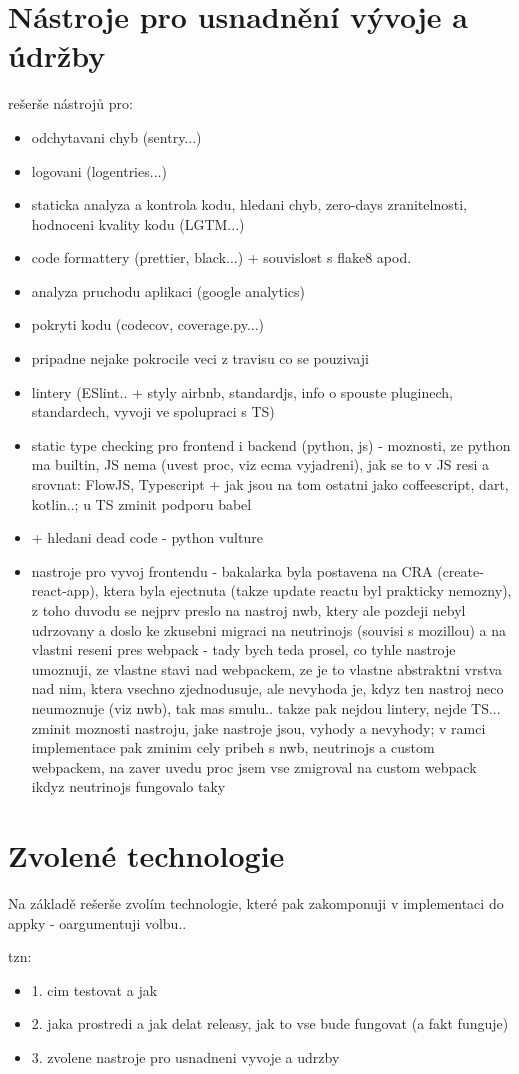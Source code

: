 \chapter{Nástroje pro usnadnění vývoje a údržby}
rešerše nástrojů pro:
\begin{itemize}
\item odchytavani chyb (sentry...)
\item logovani (logentries...)
\item staticka analyza a kontrola kodu, hledani chyb, zero-days zranitelnosti, hodnoceni kvality kodu (LGTM...)
\item code formattery (prettier, black...) + souvislost s flake8 apod.
\item analyza pruchodu aplikaci (google analytics)
\item pokryti kodu (codecov, coverage.py...)
\item pripadne nejake pokrocile veci z travisu co se pouzivaji
\item lintery (ESlint.. + styly airbnb, standardjs, info o spouste pluginech, standardech, vyvoji ve spolupraci s TS)
\item static type checking pro frontend i backend (python, js) - moznosti, ze python ma builtin, JS nema (uvest proc, viz ecma vyjadreni), jak se to v JS resi a srovnat: FlowJS, Typescript + jak jsou na tom ostatni jako coffeescript, dart, kotlin..; u TS zminit podporu babel
\item + hledani dead code - python vulture
\item nastroje pro vyvoj frontendu - bakalarka byla postavena na CRA (create-react-app), ktera byla ejectnuta (takze update reactu byl prakticky nemozny), z toho duvodu se nejprv preslo na nastroj nwb, ktery ale pozdeji nebyl udrzovany a doslo ke zkusebni migraci na neutrinojs (souvisi s mozillou) a na vlastni reseni pres webpack - tady bych teda prosel, co tyhle nastroje umoznuji, ze vlastne stavi nad webpackem, ze je to vlastne abstraktni vrstva nad nim, ktera vsechno zjednodusuje, ale nevyhoda je, kdyz ten nastroj neco neumoznuje (viz nwb), tak mas smulu.. takze pak nejdou lintery, nejde TS... zminit moznosti nastroju, jake nastroje jsou, vyhody a nevyhody; v ramci implementace pak zminim cely pribeh s nwb, neutrinojs a custom webpackem, na zaver uvedu proc jsem vse zmigroval na custom webpack ikdyz neutrinojs fungovalo taky
\end{itemize}


\chapter{Zvolené technologie}
Na základě rešerše zvolím technologie, které pak zakomponuji v implementaci do appky - oargumentuji volbu..

tzn:

\begin{itemize}
\item 1. cim testovat a jak
\item 2. jaka prostredi a jak delat releasy, jak to vse bude fungovat (a fakt funguje)
\item 3. zvolene nastroje pro usnadneni vyvoje a udrzby
\end{itemize}